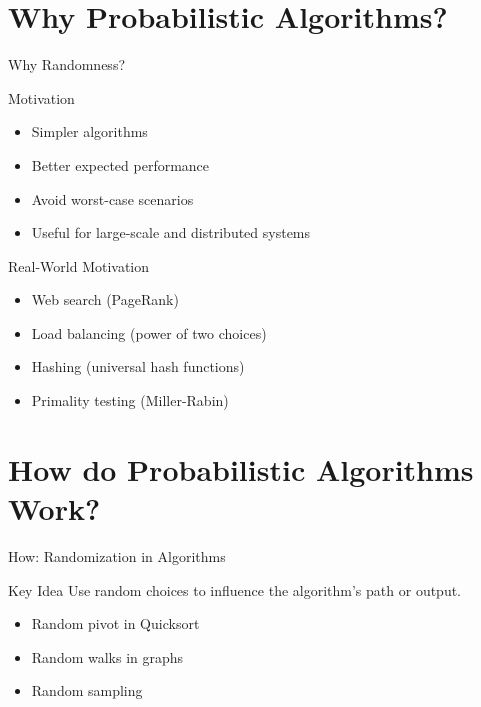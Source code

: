 \documentclass[aspectratio=169]{beamer}
\begin{document}
\section{Why Probabilistic Algorithms?}
\begin{frame}{Why Randomness?}
  \begin{block}{Motivation}
    \begin{itemize}
      \item Simpler algorithms
            \pause
      \item Better expected performance
            \pause
      \item Avoid worst-case scenarios
            \pause
      \item Useful for large-scale and distributed systems
    \end{itemize}
  \end{block}
\end{frame}

\begin{frame}{Real-World Motivation}
  \begin{itemize}
    \item Web search (PageRank)
          \pause
    \item Load balancing (power of two choices)
          \pause
    \item Hashing (universal hash functions)
          \pause
    \item Primality testing (Miller-Rabin)
  \end{itemize}
\end{frame}

\section{How do Probabilistic Algorithms Work?}
\begin{frame}{How: Randomization in Algorithms}
  \begin{block}{Key Idea}
    Use random choices to influence the algorithm's path or output.
  \end{block}
  \pause
  \begin{itemize}
    \item Random pivot in Quicksort
          \pause
    \item Random walks in graphs
          \pause
    \item Random sampling
  \end{itemize}
\end{frame}
\end{document}
